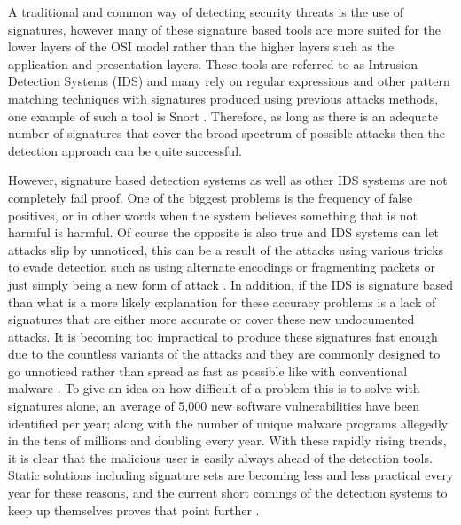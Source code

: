 A traditional and common way of detecting security threats is the use of signatures, however many of these signature based tools are more suited for the lower layers of the OSI model rather than the higher layers such as the application and presentation layers.  These tools are referred to as Intrusion Detection Systems (IDS) and many rely on regular expressions and other pattern matching techniques with signatures produced using previous attacks methods, one example of such a tool is Snort \cite{mainPaper}.  Therefore, as long as there is an adequate number of signatures that cover the broad spectrum of possible attacks then the detection approach can be quite successful.

However, signature based detection systems as well as other IDS systems are not completely fail proof.  One of the biggest problems is the frequency of false positives, or in other words when the system believes something that is not harmful is harmful.  Of course the opposite is also true and IDS systems can let attacks slip by unnoticed, this can be a result of the attacks using various tricks to evade detection such as using alternate encodings or fragmenting packets or just simply being a new form of attack \cite{onTheVerification}.  In addition, if the IDS is signature based than what is a more likely explanation for these accuracy problems is a lack of signatures that are either more accurate or cover these new undocumented attacks.  It is becoming too impractical to produce these signatures fast enough due to the countless variants of the attacks and they are commonly designed to go unnoticed rather than spread as fast as possible like with conventional malware \cite{trendMicro}.  To give an idea on how difficult of a problem this is to solve with signatures alone, an average of 5,000 new software vulnerabilities have been identified per year; along with the number of unique malware programs allegedly in the tens of millions and doubling every year.  With these rapidly rising trends, it is clear that the malicious user is easily always ahead of the detection tools.  Static solutions including signature sets are becoming less and less practical every year for these reasons, and the current short comings of the detection systems to keep up themselves proves that point further \cite{onTheVerification}.

